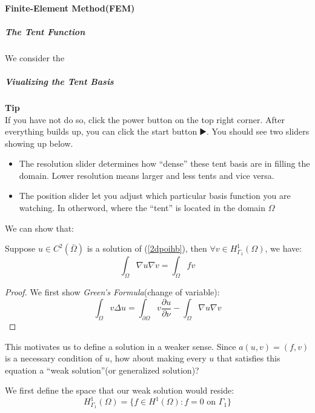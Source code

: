 \paragraph{Finite-Element Method(FEM)}

\subparagraph{The Tent Function}

We consider the

\subparagraph{Viualizing the Tent Basis}

\begin{framed}
\textbf{Tip}\\
If you have not do so, click the power button on the top right corner.
After everything builds up, you can click the start button ▶️. You should see two sliders showing up below.

\begin{itemize}
\item The resolution slider determines how ``dense'' these tent basis are in filling the domain. Lower resolution means larger and less tents and vice versa.
\item The position slider let you adjust which particular basis function you are watching. In otherword, where the ``tent'' is located in the domain $\Omega$
\end{itemize}
\end{framed}


We can show that:

\begin{proposition}Suppose $u \in C^2(\bar \Omega)$ is a solution of (\ref{2dpoihb}), then $\forall v \in H^1_{\Gamma_1}(\Omega)$, we have:
\begin{equation}
\int_{\Omega}\nabla u \nabla v=\int_{\Omega} fv
\end{equation}

\end{proposition}\begin{proof}We first show \textit{Green's Formula}(change of variable):
\begin{equation}
\int_{\Omega}v \Delta u = \int_{\partial \Omega} v \frac{\partial u}{\partial \nu} - \int_{\Omega} \nabla u \nabla v
\end{equation}

\end{proof}This motivates us to define a solution in a weaker sense. Since $a(u,v)=(f,v)$ is a necessary condition of $u$, how about making every $u$ that satisfies this equation a ``weak solution''(or generalized solution)?

We first define the space that our weak solution would reside:
\begin{equation}
H^1_{\Gamma_1}(\Omega)=\{f\in H^1(\Omega): f=0 \text{ on } \Gamma_1 \}
\end{equation}